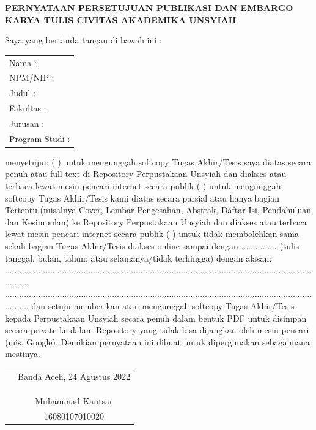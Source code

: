 \newpage
\begin{center}
    \large{\textbf{PERNYATAAN PERSETUJUAN PUBLIKASI DAN EMBARGO KARYA TULIS CIVITAS AKADEMIKA UNSYIAH}}
\end{center}

\vspace*{0.5cm}
Saya yang bertanda tangan di bawah ini :
\newline
\hspace*{2cm}
\begin{tabular}{l}
	Nama :\\
	NPM/NIP :\\
	Judul :\\
	Fakultas :\\
	Jurusan :\\
	Program Studi :
\end{tabular}

\vspace*{0.5cm}
menyetujui:
\newline
( ) untuk mengunggah softcopy Tugas Akhir/Tesis saya diatas secara penuh atau full-text
di Repository Perpustakaan Unsyiah dan diakses atau terbaca lewat mesin pencari
internet secara publik
\newline
( ) untuk mengunggah softcopy Tugas Akhir/Tesis kami diatas secara parsial atau hanya bagian Tertentu (misalnya Cover, Lembar Pengesahan, Abstrak, Daftar Isi, Pendahuluan dan Kesimpulan) ke Repository Perpustakaan Unsyiah dan diakses atau terbaca lewat mesin pencari internet secara publik
\newline
( ) untuk tidak membolehkan sama sekali bagian Tugas Akhir/Tesis diakses online sampai dengan ............... (tulis tanggal, bulan, tahun; atau selamanya/tidak terhingga) dengan alasan: ...........................................................................................................................................
...........................................................................................................................................
dan setuju memberikan atau mengunggah softcopy Tugas Akhir/Tesis kepada Perpustakaan Unsyiah secara penuh dalam bentuk PDF untuk disimpan secara private ke dalam Repository yang tidak bisa dijangkau oleh mesin pencari (mis. Google).
\newline
Demikian pernyataan ini dibuat untuk dipergunakan sebagaimana mestinya.

\vspace*{0.5cm}

\begin{tabular}{p{7.5cm}c}
	&Banda Aceh, 24 Agustus 2022\\
	&\\
	&\\
	&\\
	&Muhammad Kautsar\\
	&16080107010020
\end{tabular}